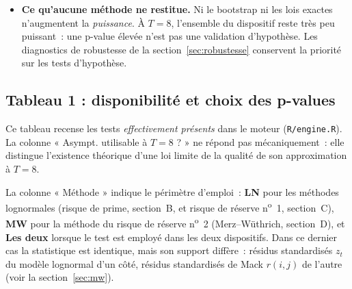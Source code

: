 \documentclass[a4paper,11pt]{article}
\newcommand{\code}[1]{\texttt{\small #1}}
\begin{document}
\begin{itemize}[itemsep=3pt]
  \emph{atome} en la valeur observée~: la p-value de Monte-Carlo s'y décide au
  signe d'un bruit numérique. À la
  différence des deux cas précédents, il n'y a ici aucun repli possible~: ni
  loi exacte, ni loi nominale utilisable, cette dernière produisant à
  $\hat\pi_t$ constant une p-value qui ne dépend plus des données. Ces deux
  lignes sont restituées comme \emph{diagnostics}, sans p-value retenue et avec
  le motif.
  \item \textbf{Ce qu'aucune méthode ne restitue.} Ni le bootstrap ni les lois
  exactes n'augmentent la \emph{puissance}. À $T = 8$, l'ensemble du dispositif
  reste très peu puissant~: une p-value élevée n'est pas une validation
  d'hypothèse. Les diagnostics de robustesse de la section~\ref{sec:robustesse} conservent la
  priorité sur les tests d'hypothèse.
\end{itemize}

\newpage
\subsection{Tableau 1 : disponibilité et choix des p-values}
\label{tab:nature}

Ce tableau recense les tests \emph{effectivement présents} dans le moteur
(\code{R/engine.R}). La colonne « Asympt. utilisable à $T = 8$ ? » ne répond pas
mécaniquement~: elle distingue l'existence théorique d'une loi limite de la
qualité de son approximation à $T = 8$.

La colonne « Méthode » indique le périmètre d'emploi~: \textbf{LN} pour les
méthodes lognormales (risque de prime, section~B, et risque de réserve
n\textsuperscript{o}~1, section~C), \textbf{MW} pour la méthode du risque de
réserve n\textsuperscript{o}~2 (Merz--Wüthrich, section~D), et
\textbf{Les deux} lorsque le test est employé dans les deux dispositifs. Dans ce
dernier cas la statistique est identique, mais son support diffère~: résidus
standardisés $z_t$ du modèle lognormal d'un côté, résidus standardisés de Mack
$r(i,j)$ de l'autre
(voir la section~\ref{sec:mw}).
\end{document}
